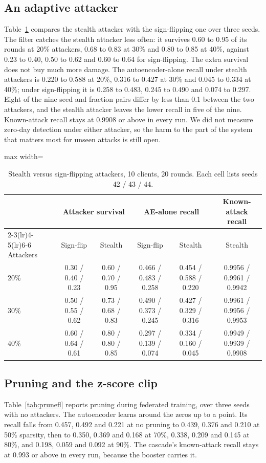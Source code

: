 \subsection{An adaptive attacker}
\label{sec:adaptive}
Table~\ref{tab:stealth} compares the stealth attacker with the sign-flipping one over three seeds. The filter catches the stealth attacker less often: it survives 0.60 to 0.95 of its rounds at 20\% attackers, 0.68 to 0.83 at 30\% and 0.80 to 0.85 at 40\%, against 0.23 to 0.40, 0.50 to 0.62 and 0.60 to 0.64 for sign-flipping. The extra survival does not buy much more damage. The autoencoder-alone recall under stealth attackers is 0.220 to 0.588 at 20\%, 0.316 to 0.427 at 30\% and 0.045 to 0.334 at 40\%; under sign-flipping it is 0.258 to 0.483, 0.245 to 0.490 and 0.074 to 0.297. Eight of the nine seed and fraction pairs differ by less than 0.1 between the two attackers, and the stealth attacker leaves the lower recall in five of the nine. Known-attack recall stays at 0.9908 or above in every run. We did not measure zero-day detection under either attacker, so the harm to the part of the system that matters most for unseen attacks is still open.

\begin{table}[t]
\centering
\caption{Stealth versus sign-flipping attackers, 10 clients, 20 rounds. Each cell lists seeds 42 / 43 / 44.}
\label{tab:stealth}
\small
\begin{adjustbox}{max width=\linewidth}
\begin{tabular}{lccccc}
\toprule
 & \multicolumn{2}{c}{Attacker survival} & \multicolumn{2}{c}{AE-alone recall} & Known-attack recall \\
\cmidrule(lr){2-3}\cmidrule(lr){4-5}\cmidrule(lr){6-6}
Attackers & Sign-flip & Stealth & Sign-flip & Stealth & Stealth \\
\midrule
20\% & 0.30 / 0.40 / 0.23 & 0.60 / 0.70 / 0.95 & 0.466 / 0.483 / 0.258 & 0.454 / 0.588 / 0.220 & 0.9956 / 0.9961 / 0.9942 \\
30\% & 0.50 / 0.55 / 0.62 & 0.73 / 0.68 / 0.83 & 0.490 / 0.373 / 0.245 & 0.427 / 0.329 / 0.316 & 0.9961 / 0.9956 / 0.9953 \\
40\% & 0.60 / 0.64 / 0.61 & 0.80 / 0.80 / 0.85 & 0.297 / 0.139 / 0.074 & 0.334 / 0.160 / 0.045 & 0.9949 / 0.9939 / 0.9908 \\
\bottomrule
\end{tabular}
\end{adjustbox}
\end{table}

\subsection{Pruning and the z-score clip}
\label{sec:prune}
Table~\ref{tab:prunefl} reports pruning during federated training, over three seeds with no attackers. The autoencoder learns around the zeros up to a point. Its recall falls from 0.457, 0.492 and 0.221 at no pruning to 0.439, 0.376 and 0.210 at 50\% sparsity, then to 0.350, 0.369 and 0.168 at 70\%, 0.338, 0.209 and 0.145 at 80\%, and 0.198, 0.059 and 0.092 at 90\%. The cascade's known-attack recall stays at 0.993 or above in every run, because the booster carries it.


